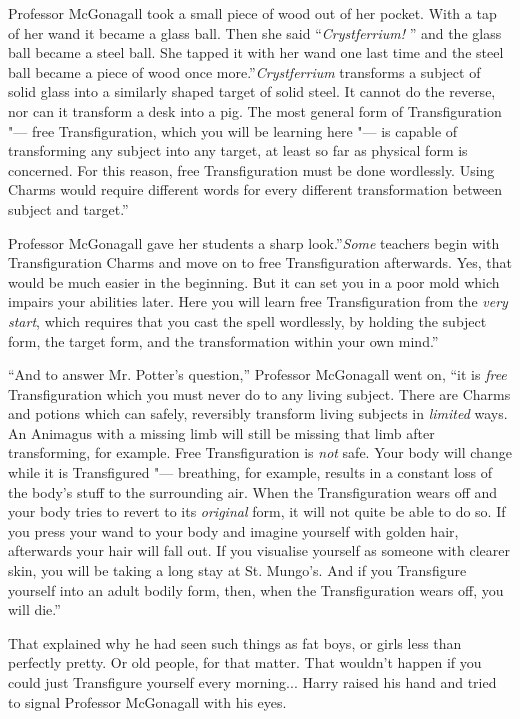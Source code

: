 Professor McGonagall took a small piece of wood out of her pocket. With
a tap of her wand it became a glass ball. Then she said
``\emph{Crystferrium!} '' and the glass ball became a steel ball. She
tapped it with her wand one last time and the steel ball became a piece
of wood once more.''\emph{Crystferrium} transforms a subject of solid
glass into a similarly shaped target of solid steel. It cannot do the
reverse, nor can it transform a desk into a pig. The most general form
of Transfiguration "--- free Transfiguration, which you will be learning
here "--- is capable of transforming any subject into any target, at least
so far as physical form is concerned. For this reason, free
Transfiguration must be done wordlessly. Using Charms would require
different words for every different transformation between subject and
target.''

Professor McGonagall gave her students a sharp look.''\emph{Some}
teachers begin with Transfiguration Charms and move on to free
Transfiguration afterwards. Yes, that would be much easier in the
beginning. But it can set you in a poor mold which impairs your
abilities later. Here you will learn free Transfiguration from the
\emph{very start}, which requires that you cast the spell wordlessly, by
holding the subject form, the target form, and the transformation within
your own mind.''

``And to answer Mr. Potter's question,'' Professor McGonagall went on,
``it is \emph{free} Transfiguration which you must never do to any living
subject. There are Charms and potions which can safely, reversibly
transform living subjects in \emph{limited} ways. An Animagus with a
missing limb will still be missing that limb after transforming, for
example. Free Transfiguration is \emph{not} safe. Your body will change
while it is Transfigured "--- breathing, for example, results in a constant
loss of the body's stuff to the surrounding air. When the
Transfiguration wears off and your body tries to revert to its
\emph{original} form, it will not quite be able to do so. If you press
your wand to your body and imagine yourself with golden hair, afterwards
your hair will fall out. If you visualise yourself as someone with
clearer skin, you will be taking a long stay at St. Mungo's. And if you
Transfigure yourself into an adult bodily form, then, when the
Transfiguration wears off, you will die.''

That explained why he had seen such things as fat boys, or girls less
than perfectly pretty. Or old people, for that matter. That wouldn't
happen if you could just Transfigure yourself every morning...
Harry raised his hand and tried to signal Professor McGonagall with his
eyes.

